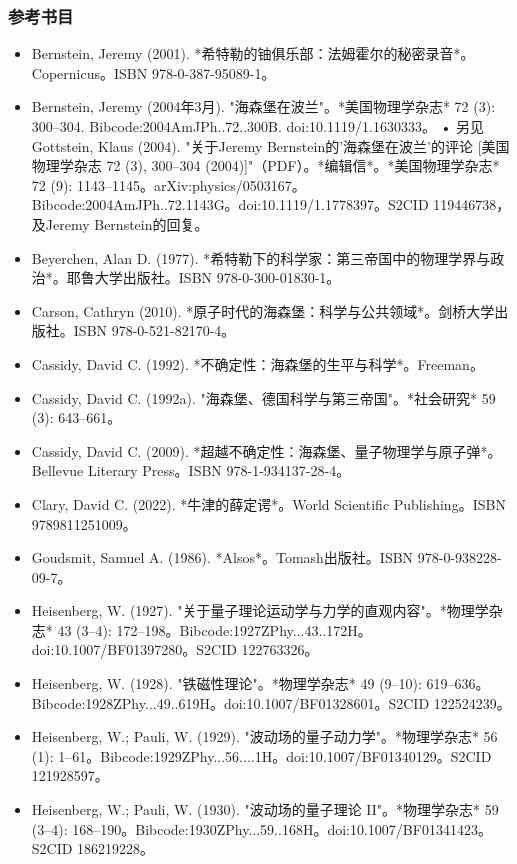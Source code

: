 \subsubsection{参考书目}
\begin{itemize}
\item Bernstein, Jeremy (2001). *希特勒的铀俱乐部：法姆霍尔的秘密录音*。Copernicus。ISBN 978-0-387-95089-1。  
\item Bernstein, Jeremy (2004年3月). "海森堡在波兰"。*美国物理学杂志* 72 (3): 300–304. Bibcode:2004AmJPh..72..300B. doi:10.1119/1.1630333。  
  • 另见 Gottstein, Klaus (2004). "关于Jeremy Bernstein的'海森堡在波兰'的评论 [美国物理学杂志 72 (3), 300–304 (2004)]"（PDF）。*编辑信*。*美国物理学杂志* 72 (9): 1143–1145。arXiv:physics/0503167。Bibcode:2004AmJPh..72.1143G。doi:10.1119/1.1778397。S2CID 119446738，及Jeremy Bernstein的回复。  
\item Beyerchen, Alan D. (1977). *希特勒下的科学家：第三帝国中的物理学界与政治*。耶鲁大学出版社。ISBN 978-0-300-01830-1。  
\item Carson, Cathryn (2010). *原子时代的海森堡：科学与公共领域*。剑桥大学出版社。ISBN 978-0-521-82170-4。  
\item Cassidy, David C. (1992). *不确定性：海森堡的生平与科学*。Freeman。  
\item Cassidy, David C. (1992a). "海森堡、德国科学与第三帝国"。*社会研究* 59 (3): 643–661。  
\item Cassidy, David C. (2009). *超越不确定性：海森堡、量子物理学与原子弹*。Bellevue Literary Press。ISBN 978-1-934137-28-4。  
\item Clary, David C. (2022). *牛津的薛定谔*。World Scientific Publishing。ISBN 9789811251009。
\item Goudsmit, Samuel A. (1986). *Alsos*。Tomash出版社。ISBN 978-0-938228-09-7。  
\item Heisenberg, W. (1927). "关于量子理论运动学与力学的直观内容"。*物理学杂志* 43 (3–4): 172–198。Bibcode:1927ZPhy...43..172H。doi:10.1007/BF01397280。S2CID 122763326。  
\item Heisenberg, W. (1928). "铁磁性理论"。*物理学杂志* 49 (9–10): 619–636。Bibcode:1928ZPhy...49..619H。doi:10.1007/BF01328601。S2CID 122524239。  
\item Heisenberg, W.; Pauli, W. (1929). "波动场的量子动力学"。*物理学杂志* 56 (1): 1–61。Bibcode:1929ZPhy...56....1H。doi:10.1007/BF01340129。S2CID 121928597。  
\item Heisenberg, W.; Pauli, W. (1930). "波动场的量子理论 II"。*物理学杂志* 59 (3–4): 168–190。Bibcode:1930ZPhy...59..168H。doi:10.1007/BF01341423。S2CID 186219228。  

\end{itemize}
